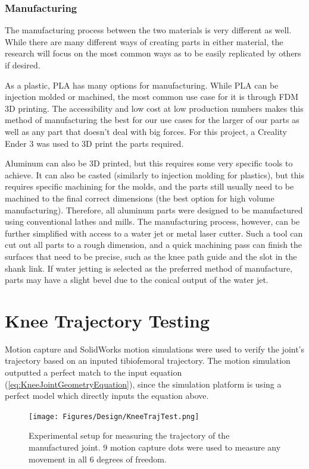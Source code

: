 \subsubsection{Manufacturing}

The manufacturing process between the two materials is very different as well. While there are many different ways of creating parts in either material, the research will focus on the most common ways as to be easily replicated by others if desired.

As a plastic, PLA has many options for manufacturing. While PLA can be injection molded or machined, the most common use case for it is through FDM 3D printing. The accessibility and low cost at low production numbers makes this method of manufacturing the best for our use cases for the larger of our parts as well as any part that doesn't deal with big forces. For this project, a Creality Ender 3 was used to 3D print the parts required. 

Aluminum can also be 3D printed, but this requires some very specific tools to achieve. It can also be casted (similarly to injection molding for plastics), but this requires specific machining for the molds, and the parts still usually need to be machined to the final correct dimensions (the best option for high volume manufacturing). Therefore, all aluminum parts were designed to be manufactured using conventional lathes and mills. The manufacturing process, however, can be further simplified with access to a water jet or metal laser cutter. Such a tool can cut out all parts to a rough dimension, and a quick machining pass can finish the surfaces that need to be precise, such as the knee path guide and the slot in the shank link. If water jetting is selected as the preferred method of manufacture, parts may have a slight bevel due to the conical output of the water jet.

\section{Knee Trajectory Testing}
Motion capture and SolidWorks motion simulations were used to verify the joint's trajectory based on an inputed tibiofemoral trajectory. The motion simulation outputted a perfect match to the input equation (\autoref{eq:KneeJointGeometryEquation}), since the simulation platform is using a perfect model which directly inputs the equation above.

\begin{figure}[ht!]
    \centering
    \texttt{[image: Figures/Design/KneeTrajTest.png]}
    \caption{Experimental setup for measuring the trajectory of the manufactured joint. 9 motion capture dots were used to measure any movement in all 6 degrees of freedom.}
    \label{fig:TrajTestSetup}
\end{figure}

